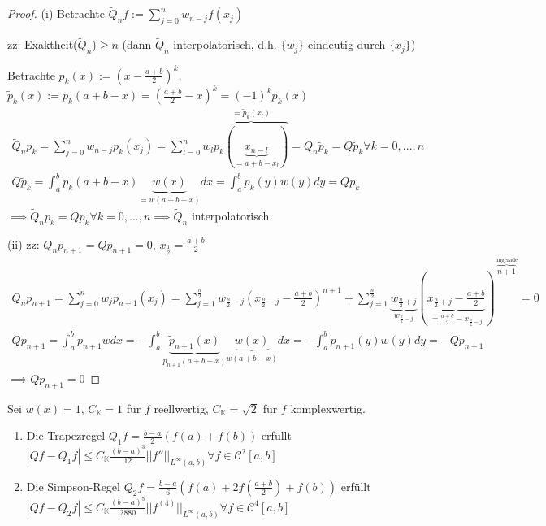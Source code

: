 \begin{proof}
	(i) Betrachte $\tilde{Q}_nf := \sum_{j=0}^{n} w_{n-j} f(x_j)$
	
	zz: Exaktheit($\tilde{Q}_n$)$\geq n$ (dann $\tilde{Q}_n$ interpolatorisch, d.h. $\{w_j\}$ eindeutig durch $\{x_j\}$)
	
	Betrachte $p_k(x) := \left(x - \frac{a+b}{2}\right)^k$, $\tilde{p}_k(x) := p_k(a+b-x) = \left(\frac{a+b}{2} - x\right)^k = (-1)^k p_k(x)$
	\begin{align*}
		\tilde{Q}_np_k = \sum_{j=0}^{n} w_{n-j}p_k(x_j) = \sum_{l=0}^{n} w_l \overbrace{p_k(\underbrace{x_{n-l}}_{=a+b-x_l})}^{=\tilde{p}_k(x_l)} = Q_n\tilde{p}_k = Q\tilde{p}_k \forall k=0, ..., n\\
		Q\tilde{p}_k = \int_{a}^{b} p_k(a+b-x) \underbrace{w(x)}_{=w(a+b-x)} dx = \int_{a}^{b} p_k(y) w(y) dy = Qp_k
	\end{align*}
	$\implies \tilde{Q}_np_k = Qp_k \forall k=0, ..., n \implies \tilde{Q}_n$ interpolatorisch.
	
	(ii) zz: $Q_np_{n+1} = Qp_{n+1} = 0$, $x_{\frac{1}{2}} = \frac{a+b}{2}$
	\begin{align*}
		Q_np_{n+1} = \sum_{j=0}^{n} w_j p_{n+1}(x_j) =
		\sum_{j=1}^{\frac{n}{2}} w_{\frac{n}{2} - j} (x_{\frac{n}{2} - j} - \frac{a+b}{2})^{n+1} +
		\sum_{j=1}^{\frac{n}{2}} \underbrace{w_{\frac{n}{2} + j}}_{w_{\frac{n}{2} - j}}
		\left( \underbrace{x_{\frac{n}{2} + j} - \frac{a+b}{2} }_{= \frac{a+b}{2} - x_{\frac{n}{2} - j}} \right)^{\overbrace{n+1}^{\text{ungerade}}} = 0\\
		Qp_{n+1} = \int_{a}^{b} p_{n+1} w dx = - \int_{a}^{b} \underbrace{\tilde{p}_{n+1}(x)}_{p_{n+1}(a+b-x)} \underbrace{w(x)}_{w(a+b-x)} dx =
		- \int_{a}^{b} p_{n+1}(y) w(y) dy = - Qp_{n+1}
	\end{align*}
	$\implies Qp_{n+1} = 0$
\end{proof}

\begin{corollary}
	Sei $w(x)=1$, $C_\mathbb{K} = 1$ für $f$ reellwertig, $C_{\mathbb{K}} = \sqrt{2}$ für $f$ komplexwertig.
	\begin{enumerate}
		\item Die Trapezregel $Q_1f = \frac{b-a}{2} (f(a) + f(b))$ erfüllt $|Qf - Q_1f| \leq C_{\mathbb{K}} \frac{(b-a)^3}{12} ||f''||_{L^\infty(a,b)} \forall f \in \mathcal{C}^2[a,b]$
		\item Die Simpson-Regel $Q_2f = \frac{b-a}{6} \left(f(a) + 2f\left(\frac{a+b}{2}\right) + f(b)\right)$ erfüllt $|Qf - Q_2f| \leq C_{\mathbb{K}} \frac{(b-a)^5}{2880} ||f^{(4)}||_{L^\infty(a,b)} \forall f \in \mathcal{C}^4[a,b]$
	\end{enumerate}
\end{corollary}

